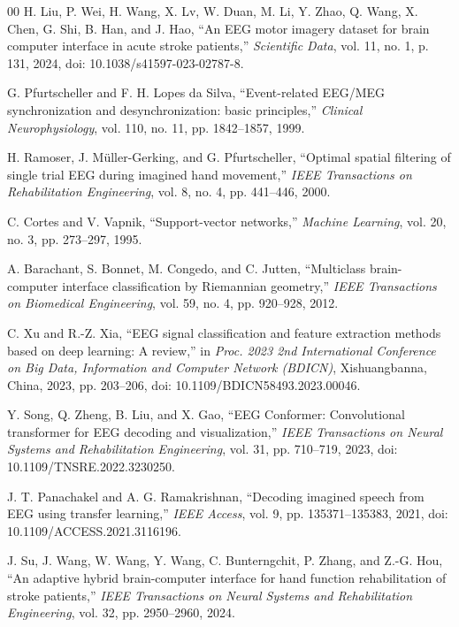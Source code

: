 \begin{thebibliography}{00}
H. Liu, P. Wei, H. Wang, X. Lv, W. Duan, M. Li, Y. Zhao, Q. Wang, X. Chen, G. Shi,
B. Han, and J. Hao, ``An EEG motor imagery dataset for brain computer interface in
acute stroke patients,'' \textit{Scientific Data}, vol. 11, no. 1, p. 131, 2024,
doi: 10.1038/s41597-023-02787-8.

G. Pfurtscheller and F. H. Lopes da Silva, ``Event-related EEG/MEG synchronization
and desynchronization: basic principles,'' \textit{Clinical Neurophysiology},
vol. 110, no. 11, pp. 1842--1857, 1999.

H. Ramoser, J. M\"{u}ller-Gerking, and G. Pfurtscheller, ``Optimal spatial filtering
of single trial EEG during imagined hand movement,'' \textit{IEEE Transactions on
Rehabilitation Engineering}, vol. 8, no. 4, pp. 441--446, 2000.

C. Cortes and V. Vapnik, ``Support-vector networks,'' \textit{Machine Learning},
vol. 20, no. 3, pp. 273--297, 1995.

A. Barachant, S. Bonnet, M. Congedo, and C. Jutten, ``Multiclass brain-computer
interface classification by Riemannian geometry,'' \textit{IEEE Transactions on Biomedical
Engineering}, vol. 59, no. 4, pp. 920--928, 2012.

C. Xu and R.-Z. Xia, ``EEG signal classification and feature extraction methods based
on deep learning: A review,'' in \textit{Proc. 2023 2nd International Conference on
Big Data, Information and Computer Network (BDICN)}, Xishuangbanna, China, 2023,
pp. 203--206, doi: 10.1109/BDICN58493.2023.00046.

Y. Song, Q. Zheng, B. Liu, and X. Gao, ``EEG Conformer: Convolutional transformer for
EEG decoding and visualization,'' \textit{IEEE Transactions on Neural Systems and
Rehabilitation Engineering}, vol. 31, pp. 710--719, 2023,
doi: 10.1109/TNSRE.2022.3230250.

J. T. Panachakel and A. G. Ramakrishnan, ``Decoding imagined speech from EEG using
transfer learning,'' \textit{IEEE Access}, vol. 9, pp. 135371--135383, 2021,
doi: 10.1109/ACCESS.2021.3116196.

J. Su, J. Wang, W. Wang, Y. Wang, C. Bunterngchit, P. Zhang, and Z.-G. Hou,
``An adaptive hybrid brain-computer interface for hand function rehabilitation
of stroke patients,'' \textit{IEEE Transactions on Neural Systems and
Rehabilitation Engineering}, vol. 32, pp. 2950--2960, 2024.


\end{thebibliography}
